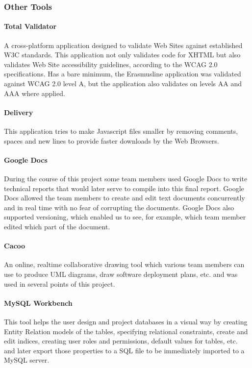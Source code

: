 \subsubsection{Other Tools}

\paragraph{Total Validator}

A cross-platform application designed to validate Web Sites
against established W3C standards. This application not only validates code for
XHTML but also validates Web Site accessibility guidelines, according to the
WCAG 2.0 specifications. Has a bare minimum, the Erasmusline application was
validated against WCAG 2.0 level A, but the application also validates on levels
AA and AAA where applied.

\paragraph{Delivery}

This application tries to make Javascript files smaller by removing comments,
spaces and new lines to provide faster downloads by the Web Browsers.

\paragraph{Google Docs}

During the course of this project some team members used Google Docs to write
technical reports that would later serve to compile into this final report.
Google Docs allowed the team members to create and edit text documents
concurrently and in real time with no fear of corrupting the documents. Google
Docs also supported versioning, which enabled us to see, for example, which team
member edited which part of the document.

\paragraph{Cacoo}

An online, realtime collaborative drawing tool which various team members can
use to produce UML diagrams, draw software deployment plans, etc. and was used
in several points of this project.

\paragraph{MySQL Workbench}
This tool helps the user design and project databases in a visual way by
creating Entity Relation models of the tables, specifying relational
constraints, create and edit indices, creating user roles and permissions,
default values for tables, etc. and later export those properties to a SQL file
to be immediately imported to a MySQL server.


